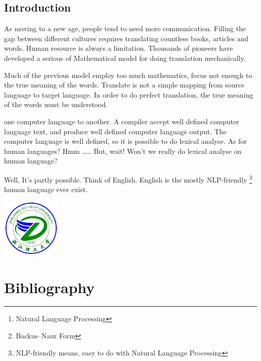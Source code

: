 \documentclass[a4paper,12pt]{article}
\title{\entitle}
\author{\enauthor}
\date{}
\begin{document}
\sloppy




\setcounter{page}{1}




\maketitle

\begin{abstract}

Real understanding of English text is required by much of tasks such as \emph{Machine Translation}, \emph{NLP\footnote{Natural Language Processing}}, etc. Building Concrete Syntax \mbox{Tree \cite{cst}} is the very first step of the \mbox{understanding} process. This thesis brings you one possible way of building Parse Tree of Natural Language -- English. It employs \emph{HMM based part-of-speech tagging} and \emph{BNF\footnote{Backus–Naur Form\protect\cite{BNF}} based Natural Language Parse Program}. 
\end{abstract}
\begin{onehalfspace}

\section{Introduction}

As moving to a new age, people tend to need more communication. Filling the gap
between different cultures requires translating countless books, articles and
words. Human resource is always a limitation. Thousands of pioneers have developed
a serious of Mathematical model for doing translation mechanically. 

Much of the previous model employ too much mathematics, focus not enough to the true meaning
of the words. Translate is not a simple mapping from source language to target language.
In order to do perfect translation, the true meaning of the words must be understood. 

one computer language to another. A compiler accept well defined computer language
text, and produce well defined computer language output. The computer language is well
defined, so it is possible to do lexical analyse. As for human languages? Hmm \ldots\ldots 
But, wait! Won't we really do lexical analyse on human language?

Well, It's partly possible. Think of English. English is the mostly
NLP-friendly \footnote{NLP-friendly means, easy to do with Natural Language Processing}
human language ever exist.

\includegraphics{zstu}

\end{onehalfspace}
\section{Bibliography}


\end{document}
